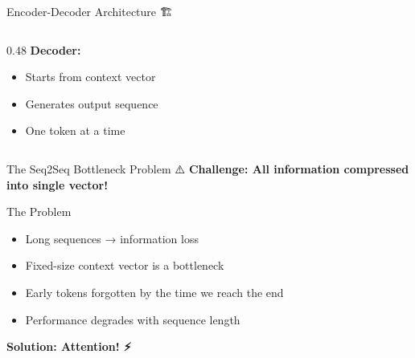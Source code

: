 \documentclass[aspectratio=169]{beamer}
\begin{document}
\begin{frame}[shrink=10]{Encoder-Decoder Architecture 🏗️}
\begin{columns}[T]
\begin{column}{0.48\textwidth}
\textbf{Decoder:}
\begin{itemize}\setlength{\itemsep}{0pt}
    \item Starts from context vector
    \item Generates output sequence
    \item One token at a time
\end{itemize}
\end{column}
\end{columns}
\end{frame}

\begin{frame}[shrink=5]{The Seq2Seq Bottleneck Problem ⚠️}
\textbf{Challenge: All information compressed into single vector!}

\vspace{1em}

\begin{alertblock}{The Problem}
\begin{itemize}\setlength{\itemsep}{0pt}
    \item Long sequences → information loss
    \item Fixed-size context vector is a bottleneck
    \item Early tokens forgotten by the time we reach the end
    \item Performance degrades with sequence length
\end{itemize}
\end{alertblock}

\vspace{1em}

\begin{center}
\end{center}

\vspace{1em}

\begin{center}
\LARGE
\textbf{Solution: Attention! ⚡}
\end{center}
\end{frame}
\end{document}
